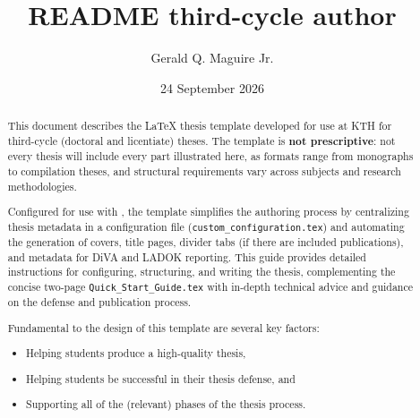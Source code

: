 \documentclass[12pt, twoside]{article}
\title{README third-cycle author}
\author{Gerald Q. Maguire Jr.}
\date{24 September 2026}
\newcommand{\fname}[1]{\texttt{#1}}
\renewcommand{\headrulewidth}{0pt}%
\renewcommand{\headrulewidth}{0pt}
\begin{document}
\maketitle




\glsresetall  %
\renewcommand{\sectionmark}[1]{\markboth{#1}{}}
\setcounter{page}{1}

\fancyhead[RO]{\sffamily\small\nouppercase\leftmark\thinspace|\thinspace\thepage}
\fancyhead[LE]{\sffamily\small\thepage\thinspace|\thinspace\nouppercase\leftmark}
\fancyfoot{}
\renewcommand{\headrulewidth}{0pt}
\pagestyle{fancy}

\setlength{\headheight}{14pt}
\addtolength{\topmargin}{-2pt}

\begin{abstract}
This document describes the \LaTeX{} thesis template developed for use at \gls{KTH} for third-cycle (doctoral and licentiate) theses. The template is \textbf{not prescriptive}: not every thesis will include every part illustrated here, as formats range from monographs to compilation theses, and structural requirements vary across subjects and research methodologies. 

Configured for use with \LuaLaTeX{}, the template simplifies the authoring process by centralizing thesis metadata in a configuration file (\fname{custom\_configuration.tex}) and automating the generation of covers, title pages, divider tabs (if there are included publications), and metadata for \gls{DiVA} and \gls{LADOK} reporting. This guide provides detailed instructions for configuring, structuring, and writing the thesis, complementing the concise two-page \fname{Quick\_Start\_Guide.tex} with in-depth technical advice and guidance on the defense and publication process.

Fundamental to the design of this template are several key factors:
\begin{itemize}
    \item Helping students produce a high-quality thesis,
    \item Helping students be successful in their thesis defense, and
    \item Supporting all of the (relevant) phases of the thesis process.
\end{itemize}
\end{abstract}
\end{document}
